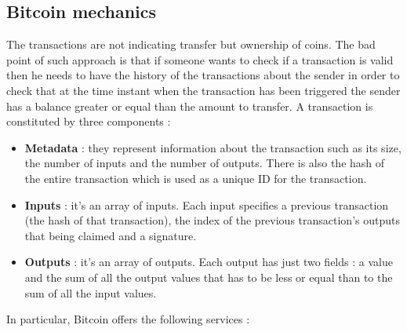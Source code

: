 \subsection{Bitcoin mechanics}
The transactions are not indicating transfer but ownership of coins. The bad point of such approach is that if someone wants to check if a transaction is valid then he needs to have the history of the transactions about the sender in order to check that at the time instant when the transaction has been triggered the sender has a balance greater or equal than the amount to transfer. A transaction is constituted by three components :
\begin{itemize}
\item \textbf{Metadata} : they represent information about the transaction such as its size, the number of inputs and the number of outputs. There is also the hash of the entire transaction which is used as a unique ID for the transaction.
\item \textbf{Inputs} : it's an array of inputs. Each input specifies a previous transaction (the hash of that transaction), the index of the previous transaction's outputs that being claimed and a signature.
\item \textbf{Outputs} : it's an array of outputs. Each output has just two fields : a value and the sum of all the output values that has to be less or equal than to the sum of all the input values.
\end{itemize}
In particular, Bitcoin offers the following services :
